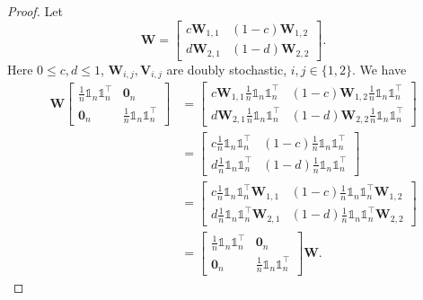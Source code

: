 \documentclass{article}
\newcommand{\vzero}{\mathbf{0}}
\newcommand{\vV}{\mathbf{V}}
\newcommand{\vW}{\mathbf{W}}
\newcommand{\bbone}{\mathds{1}}
\theoremstyle{plain}
\theoremstyle{definition}
\begin{document}
\begin{proof}
Let
$$\vW=\left[
\begin{array}{cc}
    c \vW_{1,1} & (1-c)\vW_{1,2} \\
    d\vW_{2,1} & (1-d)\vW_{2,2} 
\end{array}
\right].$$
{Here $0\leq c,d \leq 1$, $\vW_{i,j}, \vV_{i,j}$ are doubly stochastic, $i,j\in\{1,2\}$.}
We have
\begin{align*}
\vW
\left[
\begin{array}{cc}
    \frac{1}{n}\bbone_n\bbone_n^\top & \vzero_n \\
    \vzero_n & \frac{1}{n}\bbone_n\bbone_n^\top
\end{array}
\right]
&=
\left[
\begin{array}{cc}
    c \vW_{1,1}\frac{1}{n}\bbone_n\bbone_n^\top & (1-c)\vW_{1,2}\frac{1}{n}\bbone_n\bbone_n^\top \\
    d\vW_{2,1}\frac{1}{n}\bbone_n\bbone_n^\top & (1-d)\vW_{2,2}\frac{1}{n}\bbone_n\bbone_n^\top 
\end{array}
\right]\\
&=\left[
\begin{array}{cc}
    c\frac{1}{n}\bbone_n\bbone_n^\top & (1-c)\frac{1}{n}\bbone_n\bbone_n^\top \\
    d\frac{1}{n}\bbone_n\bbone_n^\top & (1-d)\frac{1}{n}\bbone_n\bbone_n^\top
\end{array}
\right]\\
&=
\left[
\begin{array}{cc}
    c \frac{1}{n}\bbone_n\bbone_n^\top\vW_{1,1} & (1-c)\frac{1}{n}\bbone_n\bbone_n^\top\vW_{1,2} \\
    d\frac{1}{n}\bbone_n\bbone_n^\top\vW_{2,1} & (1-d)\frac{1}{n}\bbone_n\bbone_n^\top\vW_{2,2} 
\end{array}
\right]\\
&=\left[
\begin{array}{cc}
    \frac{1}{n}\bbone_n\bbone_n^\top & \vzero_n \\
    \vzero_n & \frac{1}{n}\bbone_n\bbone_n^\top
\end{array}
\right]
\vW.
\end{align*}
\end{proof}
\end{document}
